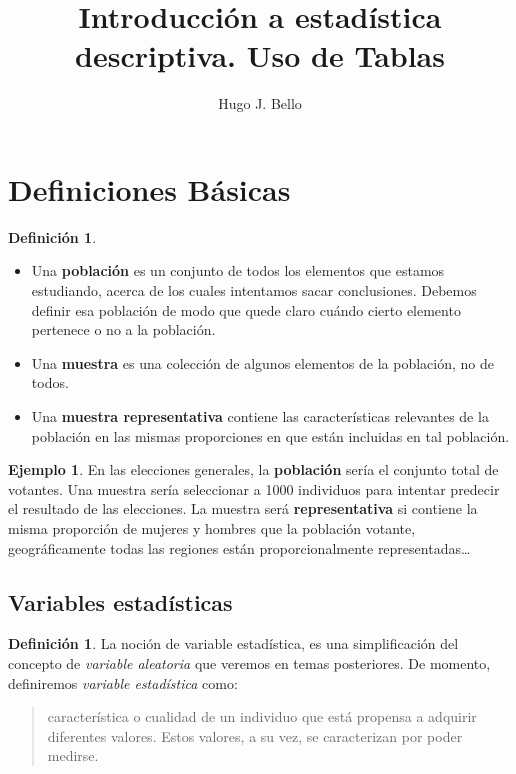 \documentclass[]{article}
\title{Introducción a estadística descriptiva. Uso de Tablas}
\author{Hugo J. Bello}
\date{}
\theoremstyle{plain}
\theoremstyle{definition}
\newtheorem{definition}[theorem]{Definición}
\newtheorem{example}[theorem]{Ejemplo}
\theoremstyle{definition} %
\begin{document}
\section{Definiciones Básicas}

\begin{definition}
  
\begin{itemize}
\item
  Una \textbf{población} es un conjunto de todos los elementos que
  estamos estudiando, acerca de los cuales intentamos sacar
  conclusiones. Debemos definir esa población de modo que quede claro
  cuándo cierto elemento pertenece o no a la población.
\item
  Una \textbf{muestra} es una colección de algunos elementos de la
  población, no de todos.
\item
  Una \textbf{muestra representativa} contiene las características
  relevantes de la población en las mismas proporciones en que están
  incluidas en tal población.
\end{itemize}
\end{definition}



\begin{example}
  
En las elecciones generales, la \textbf{población} sería el conjunto
total de votantes. Una muestra sería seleccionar a 1000 individuos para
intentar predecir el resultado de las elecciones. La muestra será
\textbf{representativa} si contiene la misma proporción de mujeres y
hombres que la población votante, geográficamente todas las regiones
están proporcionalmente representadas\ldots{}
\end{example}


\subsection{Variables estadísticas}

\begin{definition}
  La noción de variable estadística, es una simplificación del concepto de
\emph{variable aleatoria} que veremos en temas posteriores. De momento,
definiremos \emph{variable estadística} como:

\begin{quote}
característica o cualidad de un individuo que está propensa a adquirir
diferentes valores. Estos valores, a su vez, se caracterizan por poder
medirse.
\end{quote}

\end{definition}
 
\end{document}
